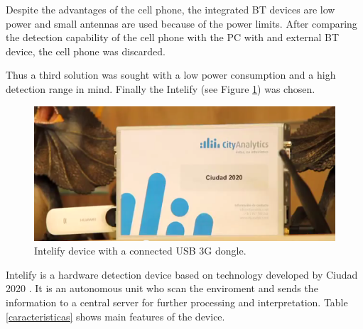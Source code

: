 \documentclass{llncs}
\begin{document}
Despite the advantages of the cell phone, the integrated BT devices are low power and small antennas are used because of the power limits. After comparing the detection capability of the cell phone with the PC with and external BT device, the cell phone was discarded.

Thus a third solution was sought with a low power consumption and a high detection range in mind. Finally the Intelify \cite{intelify} (see Figure
\ref{intelify}) was chosen.

\begin{figure}[htpb] 
\begin{center} 
\includegraphics[scale=0.5]{intelifychisme1.png}
\end{center} 
\caption{Intelify device with a connected USB 3G dongle.} 
\label{intelify} 
\end{figure}

Intelify is a hardware detection device based on technology developed by Ciudad 2020 \cite{cityanalytics,Blobject}. It is an autonomous unit who scan the enviroment and sends the information to a central server for further processing and interpretation. Table \ref{caracteristicas} shows main features of the device.
\end{document}
